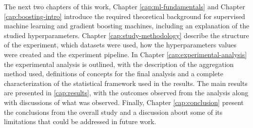 The next two chapters of this work, Chapter \ref{cap:ml-fundamentals} and Chapter \ref{cap:boosting-intro} introduce the required theoretical background for supervised machine learning and gradient boosting machines, including an explanation of the studied hyperparameters. Chapter \ref{cap:study-methodology} describe the structure of the experiment, which datasets were used, how the hyperparameters values were created and the experiment pipeline. In Chapter \ref{cap:experimental-analysis} the experimental analysis is outlined, with the description of the aggregation method used, definitions of concepts for the final analysis and a complete characterization of the statistical framework used in the results. The main results are presented in \ref{cap:results}, with the outcomes observed from the analysis along with discussions of what was observed. Finally, Chapter \ref{cap:conclusion} present the conclusions from the overall study and a discussion about some of its limitations that could be addressed in future work.